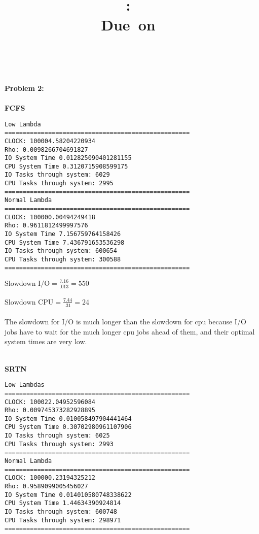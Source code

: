 \documentclass{article}
\title{
\vspace{2in}
\textmd{\textbf{\hmwkClass:\ \hmwkTitle}}\\
\normalsize\vspace{0.1in}\small{Due\ on\ \hmwkDueDate}\\
\vspace{0.1in}\large{\textit{\hmwkClassInstructor\ \hmwkClassTime}}
\vspace{3in}
}
\author{\textbf{\hmwkAuthorName}}
\date{} %
\theoremstyle{problemstyle}
\begin{document}
\maketitle



\newpage




\textbf{Problem 2:}
\\\\
\textbf{FCFS}
\begin{lstlisting}[breaklines]
Low Lambda
===================================================
CLOCK: 100004.58204220934
Rho: 0.0098266704691827
IO System Time 0.012825090401281155
CPU System Time 0.3120715908599175
IO Tasks through system: 6029
CPU Tasks through system: 2995
===================================================
Normal Lambda
===================================================
CLOCK: 100000.00494249418
Rho: 0.9611812499997576
IO System Time 7.156759764158426
CPU System Time 7.436791653536298
IO Tasks through system: 600654
CPU Tasks through system: 300588
===================================================
\end{lstlisting}

$\text{Slowdown I/O} = \frac{7.16}{.013} = 550$\\\\
$\text{Slowdown CPU} = \frac{7.44}{.31} = 24$\\
\\
The slowdown for I/O is much longer than the slowdown for cpu because I/O jobs have to wait for the much longer cpu jobs ahead of them, and their optimal system times are very low.
\\\\
\newpage

\textbf{SRTN}
\begin{lstlisting}[breaklines]
Low Lambdas
===================================================
CLOCK: 100022.04952596084
Rho: 0.009745373282928895
IO System Time 0.010058497904441464
CPU System Time 0.30702980961107906
IO Tasks through system: 6025
CPU Tasks through system: 2993
===================================================
Normal Lambda
===================================================
CLOCK: 100000.23194325212
Rho: 0.9589099005456027
IO System Time 0.014010580748338622
CPU System Time 1.44634390924814
IO Tasks through system: 600748
CPU Tasks through system: 298971
===================================================
\end{lstlisting}
\end{document}
